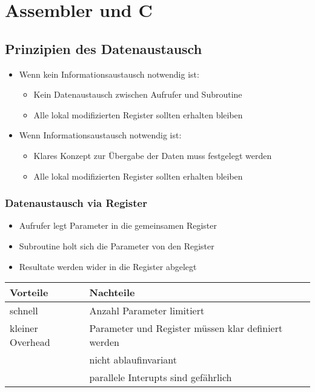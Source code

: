 \section{Assembler und C}
\subsection{Prinzipien des Datenaustausch}
\begin{itemize}
  \item Wenn kein Informationsaustausch notwendig ist:
  	\begin{itemize}
  		\item Kein Datenaustausch zwischen Aufrufer und Subroutine
  		\item Alle lokal modifizierten Register sollten erhalten bleiben
	\end{itemize}
  \item Wenn Informationsaustausch notwendig ist:
  	\begin{itemize}
  		\item Klares Konzept zur Übergabe der Daten muss festgelegt werden
  		\item Alle lokal modifizierten Register sollten erhalten bleiben
	\end{itemize}
\end{itemize}


\subsubsection{Datenaustausch via Register}
\begin{itemize}
  \item Aufrufer legt Parameter in die gemeinsamen Register
  \item Subroutine holt sich die Parameter von den Register
  \item Resultate werden wider in die Register abgelegt
\end{itemize}
\begin{tabular}{l|l}
	\textbf{Vorteile} 	& \textbf{Nachteile} \\
	\hline
	schnell				& Anzahl Parameter limitiert \\
	kleiner Overhead	& Parameter und Register müssen klar definiert werden \\
						& nicht ablaufinvariant \\ 
						& parallele Interupts sind gefährlich
\end{tabular}


